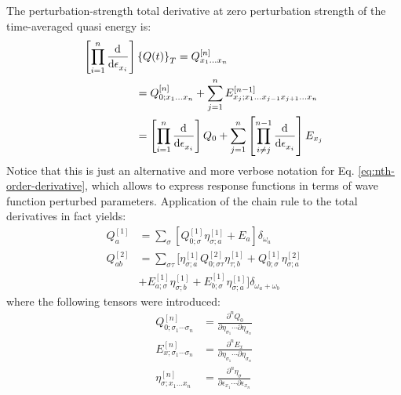 The perturbation-strength total derivative at zero perturbation strength
of the time-averaged quasi energy is:
\begin{equation}
\begin{aligned}
 \left[\prod_{i=1}^n \frac{\mathop{}\!\mathrm{d}^{}}{\mathop{}\!\mathrm{d} \epsilon_{x_i}^{}}\right]&\left\lbrace Q(t)\right\rbrace_T
 = Q^{[n]}_{x_1 \ldots x_n} \\
 &=
 Q^{[n]}_{0; x_1 \ldots x_n}
 + \sum_{j=1}^{n}E^{[n-1]}_{x_j;x_1\ldots x_{j-1}x_{j+1}\ldots x_n} \\
 &=
 \left[\prod_{i=1}^n \frac{\mathop{}\!\mathrm{d}^{}}{\mathop{}\!\mathrm{d} \epsilon_{x_i}^{}}\right]Q_0
 + \sum_{j=1}^n
 \left[\prod_{i\neq j}^{n-1} \frac{\mathop{}\!\mathrm{d}^{}}{\mathop{}\!\mathrm{d} \epsilon_{x_i}^{}}\right]E_{x_j}
\end{aligned}
\end{equation}
Notice that this is just an alternative and more verbose notation for
Eq. \eqref{eq:nth-order-derivative}, which allows to express response
functions in terms of wave function perturbed parameters.
Application of the chain rule to the total derivatives in fact yields:
\begin{subequations}
 \begin{align}
   Q^{[1]}_{a} &=
   \sum_{\sigma}\left[
   Q^{[1]}_{0; \sigma}\eta^{[1]}_{\sigma;a} + E_{a}
   \right]\delta_{\omega_a} \\
   Q^{[2]}_{ab} &=
   \sum_{\sigma\tau}\big[
   \eta^{[1]}_{\sigma;a}Q^{[2]}_{0;\sigma\tau}\eta^{[1]}_{\tau;b}
   + Q^{[1]}_{0; \sigma}\eta^{[2]}_{\sigma;a} \nonumber \\
 \hspace{10pt} &+ E^{[1]}_{a;\sigma}\eta^{[1]}_{\sigma;b}
   + E^{[1]}_{b;\sigma}\eta^{[1]}_{\sigma;a}
   \big]\delta_{\omega_a+\omega_b} \label{eq:linres}
 \end{align}
\end{subequations}
where the following tensors were introduced:
\begin{subequations}
 \begin{align}
 Q^{[n]}_{0; \sigma_1\cdots \sigma_n} &=
 \frac{\partial^n Q_0}{\partial\eta_{\sigma_1}\cdots\partial\eta_{\sigma_n}} \\
 E^{[n]}_{x;\sigma_1\cdots \sigma_n} &=
 \frac{\partial^n E_x}{\partial\eta_{\sigma_1}\cdots\partial\eta_{\sigma_n}} \\
\eta^{[n]}_{\sigma;x_1\dots x_n} &=
\frac{\partial^n \eta_\sigma}{\partial \epsilon_{x_1}\cdots\partial \epsilon_{x_n}}
 \end{align}
\end{subequations}

